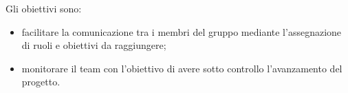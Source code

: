  Gli obiettivi sono:
\begin{itemize}
	\item{facilitare la comunicazione tra i membri del gruppo mediante l'assegnazione di ruoli e obiettivi da raggiungere;}
	\item{monitorare il team con l'obiettivo di avere sotto controllo l'avanzamento del progetto.}
\end{itemize}